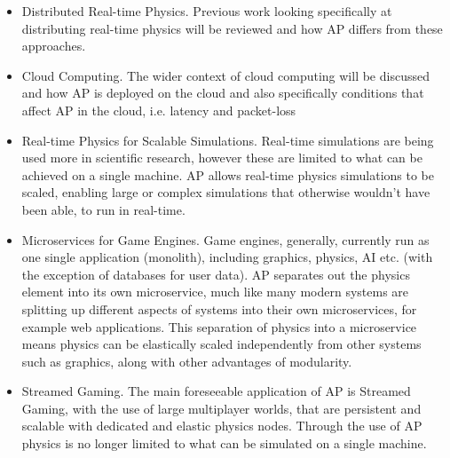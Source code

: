 \begin{enumerate}
\begin{itemize}
	\item Distributed Real-time Physics. Previous work looking specifically at distributing real-time physics will be reviewed and how AP differs from these approaches.
	\item Cloud Computing. The wider context of cloud computing will be discussed and how AP is deployed on the cloud and also specifically conditions that affect AP in the cloud, i.e. latency and packet-loss
	\item Real-time Physics for Scalable Simulations. Real-time simulations are being used more in scientific research, however these are limited to what can be achieved on a single machine. AP allows real-time physics simulations to be scaled, enabling large or complex simulations that otherwise wouldn't have been able, to run in real-time.
	\item Microservices for Game Engines. Game engines, generally, currently run as one single application (monolith), including graphics, physics, AI etc. (with the exception of databases for user data). AP separates out the physics element into its own microservice, much like many modern systems are splitting up different aspects of systems into their own microservices, for example web applications. This separation of physics into a microservice means physics can be elastically scaled independently from other systems such as graphics, along with other advantages of modularity.
	\item Streamed Gaming. The main foreseeable application of AP is Streamed Gaming, with the use of large multiplayer worlds, that are persistent and scalable with dedicated and elastic physics nodes. Through the use of AP physics is no longer limited to what can be simulated on a single machine.%
\end{itemize}


\end{enumerate}
